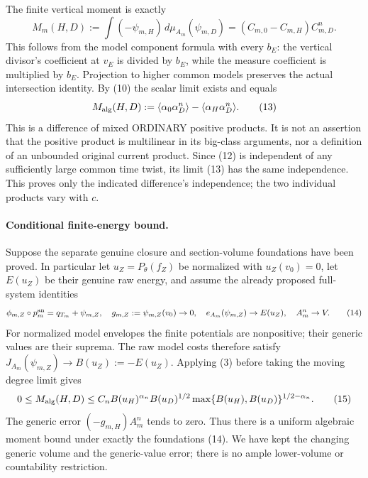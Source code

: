 \documentclass[10pt]{article}
\begin{document}
The finite vertical moment is exactly
\[
 M_m(H,D):=\int(-\psi_{m,H})\,d\mu_{A_m}(\psi_{m,D})
            =(C_{m,0}-C_{m,H})C_{m,D}^{n}.            \tag{12}
\]
This follows from the model component formula with every $b_E$:
the vertical divisor's coefficient at $v_E$ is divided by $b_E$,
while the measure coefficient is multiplied by $b_E$. Projection to
higher common models preserves the actual intersection identity.
By (10) the scalar limit exists and equals
\[
 M_{\rm alg}(H,D)
 :=\langle\alpha_0\alpha_D^n\rangle
                     -\langle\alpha_H\alpha_D^n\rangle.
 \tag{13}
\]
This is a difference of mixed ORDINARY positive products. It is not an
assertion that the positive product is multilinear in its big-class
arguments, nor a definition of an unbounded original current product.
Since (12) is independent of any sufficiently large common time twist,
its limit (13) has the same independence. This proves only the indicated
difference's independence; the two individual products vary with $c$.

\paragraph{Conditional finite-energy bound.}
Suppose the separate genuine closure and section-volume foundations
have been proved. In particular let $u_Z=P_\theta(f_Z)$ be normalized
with $u_Z(v_0)=0$, let $E(u_Z)$ be their genuine raw energy, and assume
the already proposed full-system identities
\[
 \phi_{m,Z}\circ p_m^{\rm an}=q_{T_m}+\psi_{m,Z},\quad
 g_{m,Z}:=\psi_{m,Z}(v_0)\to0,\quad
 e_{A_m}(\psi_{m,Z})\to E(u_Z),\quad A_m^n\to V.       \tag{14}
\]
For normalized model envelopes the finite potentials are nonpositive;
their generic values are their suprema. The raw model costs therefore
satisfy $J_{A_m}(\psi_{m,Z})\to B(u_Z):=-E(u_Z)$.
Applying (3) before taking the moving degree limit gives
\[
 0\le M_{\rm alg}(H,D)
 \le C_n B(u_H)^{\alpha_n}B(u_D)^{1/2}
           \max\{B(u_H),B(u_D)\}^{1/2-\alpha_n}.         \tag{15}
\]
The generic error $(-g_{m,H})A_m^n$ tends to zero. Thus there is a
uniform algebraic moment bound under exactly the foundations (14).
We have kept the changing generic volume and the generic-value error;
there is no ample lower-volume or countability restriction.
\end{document}
